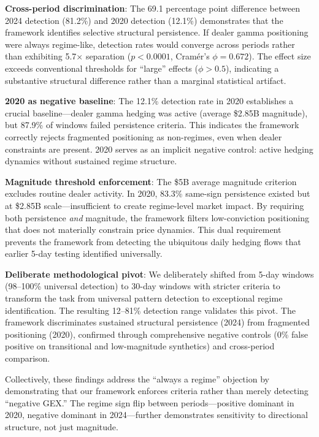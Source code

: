 \textbf{Cross-period discrimination}: The 69.1 percentage point difference between 2024 detection (81.2\%) and 2020 detection (12.1\%) demonstrates that the framework identifies selective structural persistence. If dealer gamma positioning were always regime-like, detection rates would converge across periods rather than exhibiting 5.7$\times$ separation ($p < 0.0001$, Cram\'{e}r's $\phi = 0.672$). The effect size exceeds conventional thresholds for ``large'' effects ($\phi > 0.5$), indicating a substantive structural difference rather than a marginal statistical artifact.

\textbf{2020 as negative baseline}: The 12.1\% detection rate in 2020 establishes a crucial baseline---dealer gamma hedging was active (average \$2.85B magnitude), but 87.9\% of windows failed persistence criteria. This indicates the framework correctly rejects fragmented positioning as non-regimes, even when dealer constraints are present. 2020 serves as an implicit negative control: active hedging dynamics without sustained regime structure.

\textbf{Magnitude threshold enforcement}: The \$5B average magnitude criterion excludes routine dealer activity. In 2020, 83.3\% same-sign persistence existed but at \$2.85B scale---insufficient to create regime-level market impact. By requiring both persistence \textit{and} magnitude, the framework filters low-conviction positioning that does not materially constrain price dynamics. This dual requirement prevents the framework from detecting the ubiquitous daily hedging flows that earlier 5-day testing identified universally.

\textbf{Deliberate methodological pivot}: We deliberately shifted from 5-day windows (98--100\% universal detection) to 30-day windows with stricter criteria to transform the task from universal pattern detection to exceptional regime identification. The resulting 12--81\% detection range validates this pivot. The framework discriminates sustained structural persistence (2024) from fragmented positioning (2020), confirmed through comprehensive negative controls (0\% false positive on transitional and low-magnitude synthetics) and cross-period comparison.

Collectively, these findings address the ``always a regime'' objection by demonstrating that our framework enforces criteria rather than merely detecting ``negative GEX.'' The regime sign flip between periods---positive dominant in 2020, negative dominant in 2024---further demonstrates sensitivity to directional structure, not just magnitude.

